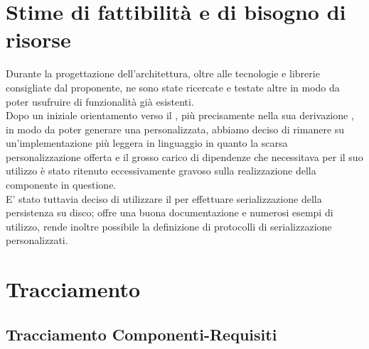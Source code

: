 \documentclass{scalatekids-article}
\begin{document}
\section{Stime di fattibilità e di bisogno di risorse}

Durante la progettazione dell'architettura, oltre alle tecnologie e librerie
consigliate dal proponente, ne sono state ricercate e testate altre in modo da
poter usufruire di funzionalità già esistenti.\\ Dopo un iniziale orientamento
verso il  , più precisamente nella sua
derivazione , in modo da poter generare una 
personalizzata, abbiamo deciso di rimanere su un'implementazione più leggera in
linguaggio  in quanto la scarsa personalizzazione offerta e il
grosso carico di dipendenze che necessitava  per il suo
utilizzo è stato ritenuto eccessivamente gravoso sulla realizzazione della
componente in questione.\\ E' stato tuttavia deciso di utilizzare il
  per effettuare serializzazione della
persistenza su disco; offre una buona documentazione e numerosi esempi di
utilizzo, rende inoltre possibile la definizione di protocolli di
serializzazione personalizzati.

\section{Tracciamento}

\subsection{Tracciamento Componenti-Requisiti}
\end{document}
